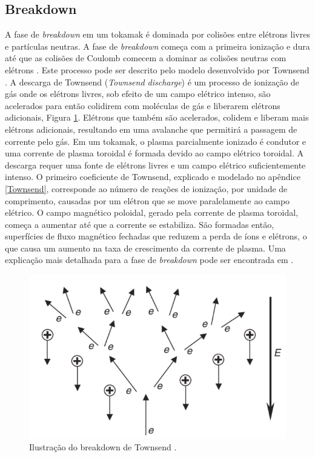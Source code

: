\documentclass[12pt,oneside,a4paper]{abntex2}
\begin{document}
\subsection{Breakdown}
\noindent A fase de \textit{breakdown} em um tokamak é dominada por colisões entre elétrons livres e partículas neutras. A fase de \textit{breakdown} começa com a primeira ionização e dura até que as colisões de Coulomb comecem a dominar as colisões neutras com elétrons \cite[pg. 55]{sinha2017plasma}. %
Este processo pode ser descrito pelo modelo desenvolvido por Townsend \cite{lloyd1991}. 
A descarga de Townsend (\textit{Townsend discharge}) é um processo de ionização de gás onde os elétrons livres, sob efeito de um campo elétrico intenso, são acelerados para então colidirem com moléculas de gás e liberarem elétrons adicionais, Figura \ref{avalanche}. 
Elétrons que também são acelerados, colidem e liberam mais elétrons adicionais, resultando em uma avalanche que permitirá a passagem de corrente pelo gás. Em um tokamak, o plasma parcialmente ionizado é condutor e uma corrente de plasma toroidal é formada devido ao campo elétrico toroidal.  
A descarga requer uma fonte de elétrons livres e um campo elétrico suficientemente intenso. 
O primeiro coeficiente de Townsend, explicado e modelado no apêndice \ref{Townsend}, corresponde ao número de reações de ionização, por unidade de comprimento, causadas por um elétron que se move paralelamente ao campo elétrico. 
O campo magnético poloidal, gerado pela corrente de plasma toroidal, começa a aumentar até que a corrente se estabiliza. 
São formadas então, superfícies de fluxo magnético fechadas que reduzem a perda de íons e elétrons, o que causa um aumento na taxa de crescimento da corrente de plasma. Uma explicação mais detalhada para a fase de \textit{breakdown} pode ser encontrada em \cite[pg. 40]{piras2011extremely}.

	\begin{figure}[H]
				\centering
			\includegraphics[scale=0.6]{avalanche.png} 
				\caption{Ilustração do breakdown de Townsend \cite{article0}.}
		\label{avalanche}
			\end{figure}
\end{document}
